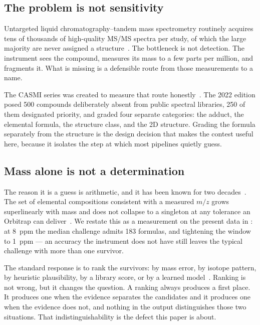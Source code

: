 \documentclass[11pt,twocolumn,a4paper]{article}
\theoremstyle{definition}
\theoremstyle{remark}
\begin{document}
\subsection{The problem is not sensitivity}

Untargeted liquid chromatography--tandem mass spectrometry routinely acquires
tens of thousands of high-quality MS/MS spectra per study, of which the large
majority are never assigned a structure~\citep{dasilva2015illuminating,
blazenovic2018software}. The bottleneck is not detection. The instrument sees the
compound, measures its mass to a few parts per million, and fragments it. What is
missing is a defensible route from those measurements to a name.

The CASMI series was created to measure that route
honestly~\citep{schymanski2017critical}. The 2022 edition posed 500 compounds
deliberately absent from public spectral libraries, 250 of them designated
priority, and graded four separate categories: the adduct, the elemental formula,
the structure class, and the 2D structure. Grading the formula separately from the
structure is the design decision that makes the contest useful here, because it
isolates the step at which most pipelines quietly guess.

\subsection{Mass alone is not a determination}

The reason it is a guess is arithmetic, and it has been known for two
decades~\citep{kind2006metabolomic,kind2007seven}. The set of elemental
compositions consistent with a measured $m/z$ grows superlinearly with mass and
does not collapse to a singleton at any tolerance an Orbitrap can
deliver~\citep{makarov2000electrostatic}. We restate this as a measurement on the
present data in : at 8~ppm the median challenge admits 183
formulas, and tightening the window to 1~ppm --- an accuracy the instrument does
not have still leaves the typical challenge with more than one survivor.

The standard response is to rank the survivors: by mass error, by isotope
pattern, by heuristic plausibility, by a library score, or by a learned
model~\citep{pluskal2012highly,duhrkop2019sirius,ruttkies2016metfrag}. Ranking is
not wrong, but it changes the question. A ranking always produces a first place.
It produces one when the evidence separates the candidates and it produces one
when the evidence does not, and nothing in the output distinguishes those two
situations. That indistinguishability is the defect this paper is about.
\end{document}
